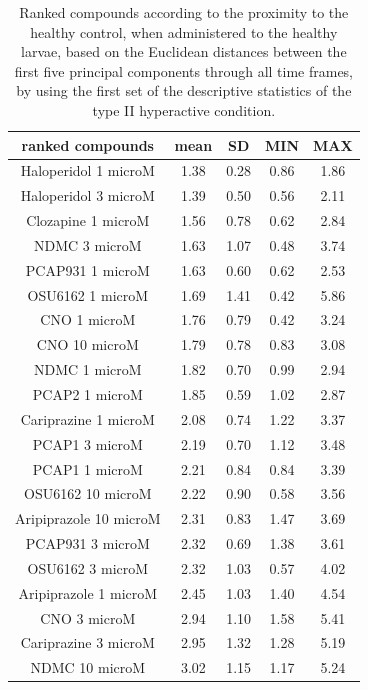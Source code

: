 \begin{table}[h!]\tiny
\centering
\caption{Ranked compounds according to the proximity to the healthy control, when administered to the healthy larvae, based on the Euclidean distances between the first five principal components through all time frames, by using the first set of the descriptive statistics of the type II hyperactive condition.}
\begin{tabular}{|c|c|c|c|c|}
\hline
ranked compounds             & mean & SD   & MIN  & MAX   \\ \hline
Haloperidol 1 microM   & 1.38 & 0.28 & 0.86 & 1.86 \\ \hline
Haloperidol 3 microM   & 1.39 & 0.50  & 0.56 & 2.11 \\ \hline
Clozapine 1 microM     & 1.56 & 0.78 & 0.62 & 2.84 \\ \hline
NDMC 3 microM          & 1.63 & 1.07 & 0.48 & 3.74 \\ \hline
PCAP931 1 microM       & 1.63 & 0.60  & 0.62 & 2.53 \\ \hline
OSU6162 1 microM       & 1.69 & 1.41 & 0.42 & 5.86 \\ \hline
CNO 1 microM           & 1.76 & 0.79 & 0.42 & 3.24 \\ \hline
CNO 10 microM          & 1.79 & 0.78 & 0.83 & 3.08 \\ \hline
NDMC 1 microM          & 1.82 & 0.70  & 0.99 & 2.94 \\ \hline
PCAP2 1 microM         & 1.85 & 0.59 & 1.02 & 2.87 \\ \hline
Cariprazine 1 microM   & 2.08 & 0.74 & 1.22 & 3.37 \\ \hline
PCAP1 3 microM         & 2.19 & 0.70  & 1.12 & 3.48 \\ \hline
PCAP1 1 microM         & 2.21 & 0.84 & 0.84 & 3.39 \\ \hline
OSU6162 10 microM      & 2.22 & 0.90  & 0.58 & 3.56 \\ \hline
Aripiprazole 10 microM & 2.31 & 0.83 & 1.47 & 3.69 \\ \hline
PCAP931 3 microM       & 2.32 & 0.69 & 1.38 & 3.61 \\ \hline
OSU6162 3 microM       & 2.32 & 1.03 & 0.57 & 4.02 \\ \hline
Aripiprazole 1 microM  & 2.45 & 1.03 & 1.40  & 4.54 \\ \hline
CNO 3 microM           & 2.94 & 1.10  & 1.58 & 5.41 \\ \hline
Cariprazine 3 microM   & 2.95 & 1.32 & 1.28 & 5.19 \\ \hline
NDMC 10 microM         & 3.02 & 1.15 & 1.17 & 5.24 \\ \hline

\end{tabular}
\end{table}
